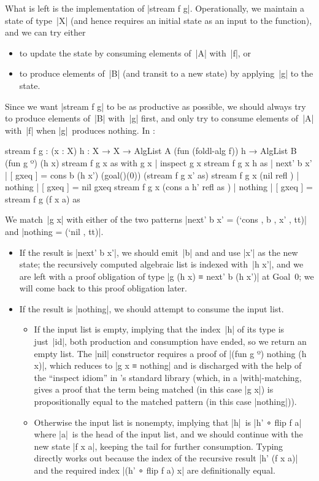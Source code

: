 What is left is the implementation of |stream f g|.
Operationally, we maintain a state of type~|X| (and hence requires an initial state as an input to the function), and we can try either
\begin{itemize}
\item to update the state by consuming elements of~|A| with~|f|, or
\item to produce elements of~|B| (and transit to a new state) by applying~|g| to the state.
\end{itemize}
Since we want |stream f g| to be as productive as possible, we should always try to produce elements of~|B| with~|g| first, and only try to consume elements of~|A| with~|f| when |g|~produces nothing.
In \Agda:
\begin{code}
stream f g :  (x : X) {h : X → X} →
              AlgList A (fun (foldl-alg f)) h → AlgList B (fun g º) (h x)
stream f g x      as                      with g x      | inspect g x
stream f g x {h}  as                      | next' b x'  | [ gxeq ] =  cons b (h x') (goal()(0))
                                                                        (stream f g x' as)
stream f g x      (nil        refl     )  | nothing     | [ gxeq ] =  nil gxeq
stream f g x      (cons a h'  refl as  )  | nothing     | [ gxeq ] =  stream f g (f x a) as
\end{code}
We match~|g x| with either of the two patterns |next' b x' = (`cons , b , x' , tt)| and |nothing = (`nil , tt)|.
\begin{itemize}
\item If the result is |next' b x'|, we should emit~|b| and and use |x'| as the new state; the recursively computed algebraic list is indexed with~|h x'|, and we are left with a proof obligation of type |g (h x) ≡ next' b (h x')| at Goal~0; we will come back to this proof obligation later.
\item If the result is |nothing|, we should attempt to consume the input list.
\begin{itemize}
\item If the input list is empty, implying that the index~|h| of its type is just~|id|, both production and consumption have ended, so we return an empty list.
The |nil| constructor requires a proof of |(fun g º) nothing (h x)|, which reduces to |g x ≡ nothing| and is discharged with the help of the ``inspect idiom'' in \Agda's standard library (which, in a |with|-matching, gives a proof that the term being matched (in this case |g x|) is propositionally equal to the matched pattern (in this case |nothing|)).
\item Otherwise the input list is nonempty, implying that |h|~is |h' ∘ flip f a| where |a|~is the head of the input list, and we should continue with the new state |f x a|, keeping the tail for further consumption.
Typing directly works out because the index of the recursive result |h' (f x a)| and the required index |(h' ∘ flip f a) x| are definitionally equal.
\end{itemize}
\end{itemize}


